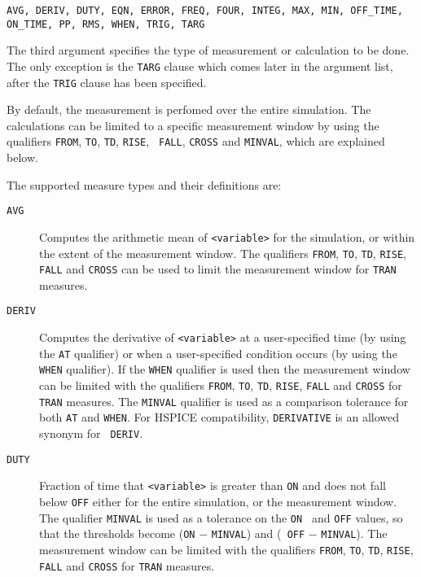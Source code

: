 \begin{Command}
\begin{Arguments}

\texttt{AVG, DERIV, DUTY, EQN, ERROR, FREQ, FOUR, INTEG, MAX, MIN, OFF\_TIME, ON\_TIME, PP, RMS, WHEN, TRIG, TARG}

The third argument specifies the type of measurement or calculation to
be done. The only exception is the {\tt TARG} clause which comes later
in the argument list, after the {\tt TRIG} clause has been specified.

By default, the measurement is perfomed over the entire simulation.
The calculations can be limited to a specific measurement window by
using the qualifiers {\tt FROM}, {\tt TO}, {\tt TD}, {\tt RISE}, {\tt
FALL}, {\tt CROSS} and {\tt MINVAL}, which are explained below.

The supported measure types and their definitions are:

\begin{description}
  \item[\tt AVG] Computes the arithmetic mean of {\tt <variable>} for
    the simulation, or within the extent of the measurement window.
    The qualifiers {\tt FROM}, {\tt TO}, {\tt TD}, {\tt RISE}, {\tt
    FALL} and {\tt CROSS} can be used to limit the measurement window
    for {\tt TRAN} measures.

  \item[\tt DERIV] Computes the derivative of {\tt <variable>} at a
    user-specified time (by using the {\tt AT} qualifier) or when a
    user-specified condition occurs (by using the {\tt WHEN}
    qualifier). If the {\tt WHEN} qualifier is used then the
    measurement window can be limited with the qualifiers {\tt FROM},
    {\tt TO}, {\tt TD}, {\tt RISE}, {\tt FALL} and {\tt CROSS} for
    {\tt TRAN} measures. The {\tt MINVAL} qualifier is used as a
    comparison tolerance for both {\tt AT} and {\tt WHEN}.  For HSPICE
    compatibility, {\tt DERIVATIVE} is an allowed synonym for {\tt
    DERIV}.

  \item[\tt DUTY] Fraction of time that {\tt <variable>} is greater than
   {\tt ON} and does not fall below {\tt OFF} either for the entire
    simulation, or the measurement window. The qualifier {\tt MINVAL}
    is used as a tolerance on the {\tt ON } and {\tt OFF} values, so
    that the thresholds become ({\tt ON} $-$ {\tt MINVAL}) and ({\tt
    OFF} $-$ {\tt MINVAL}).  The measurement window can be limited
    with the qualifiers {\tt FROM}, {\tt TO}, {\tt TD}, {\tt RISE},
    {\tt FALL} and {\tt CROSS} for {\tt TRAN} measures.


\end{description}
\end{Arguments}
\end{Command}

